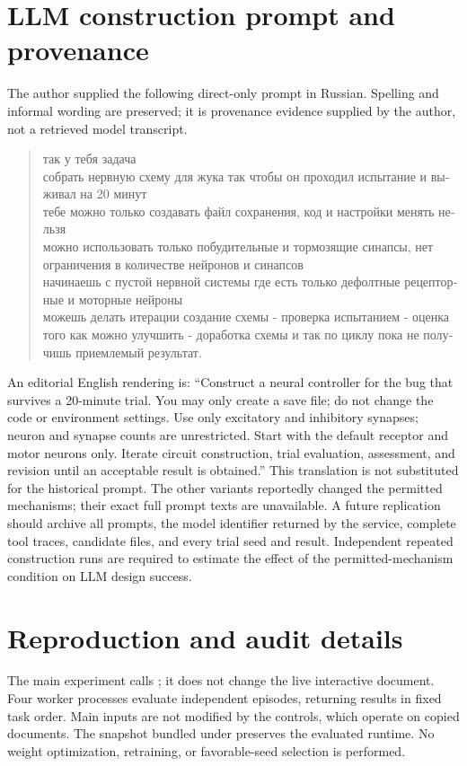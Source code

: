 \documentclass[11pt]{article}
\begin{document}
\section{LLM construction prompt and provenance}
The author supplied the following direct-only prompt in Russian. Spelling and informal wording are preserved; it is provenance evidence supplied by the author, not a retrieved model transcript.
\begin{quote}\begin{otherlanguage}{russian}\small
так у тебя задача\\
собрать нервную схему для жука так чтобы он проходил испытание и выживал на 20 минут\\
тебе можно только создавать файл сохранения, код и настройки менять нельзя\\
можно использовать только побудительные и тормозящие синапсы, нет ограничения в количестве нейронов и синапсов\\
начинаешь с пустой нервной системы где есть только дефолтные рецепторные и моторные нейроны\\
можешь делать итерации создание схемы - проверка испытанием - оценка того как можно улучшить - доработка схемы и так по циклу пока не получишь приемлемый результат.
\end{otherlanguage}\end{quote}
An editorial English rendering is: ``Construct a neural controller for the bug that survives a 20-minute trial. You may only create a save file; do not change the code or environment settings. Use only excitatory and inhibitory synapses; neuron and synapse counts are unrestricted. Start with the default receptor and motor neurons only. Iterate circuit construction, trial evaluation, assessment, and revision until an acceptable result is obtained.'' This translation is not substituted for the historical prompt. The other variants reportedly changed the permitted mechanisms; their exact full prompt texts are unavailable. A future replication should archive all prompts, the model identifier returned by the service, complete tool traces, candidate files, and every trial seed and result. Independent repeated construction runs are required to estimate the effect of the permitted-mechanism condition on LLM design success.

\section{Reproduction and audit details}
The main experiment calls ; it does not change the live interactive document. Four worker processes evaluate independent episodes, returning results in fixed task order. Main inputs are not modified by the controls, which operate on copied documents. The snapshot bundled under  preserves the evaluated runtime. No weight optimization, retraining, or favorable-seed selection is performed.
\end{document}
